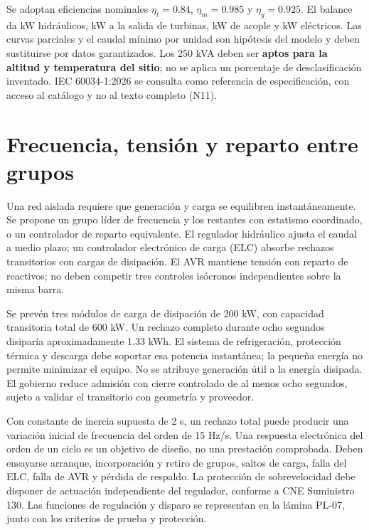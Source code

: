Se adoptan eficiencias nominales \(\eta_t=0.84\), \(\eta_m=0.985\) y \(\eta_g=0.925\). El balance da  kW hidráulicos,  kW a la salida de turbinas,  kW de acople y  kW eléctricos. Las curvas parciales y el caudal mínimo por unidad son hipótesis del modelo y deben sustituirse por datos garantizados. Los 250 kVA deben ser \textbf{aptos para la altitud y temperatura del sitio}; no se aplica un porcentaje de desclasificación inventado. IEC 60034-1:2026 se consulta como referencia de especificación, con acceso al catálogo y no al texto completo (N11).

\section{Frecuencia, tensión y reparto entre grupos}
Una red aislada requiere que generación y carga se equilibren instantáneamente. Se propone un grupo líder de frecuencia y los restantes con estatismo coordinado, o un controlador de reparto equivalente. El regulador hidráulico ajusta el caudal a medio plazo; un controlador electrónico de carga (ELC) absorbe rechazos transitorios con cargas de disipación. El AVR mantiene tensión con reparto de reactivos; no deben competir tres controles isócronos independientes sobre la misma barra.

Se prevén tres módulos de carga de disipación de 200 kW, con capacidad transitoria total de 600 kW. Un rechazo completo durante ocho segundos disiparía aproximadamente 1.33 kWh. El sistema de refrigeración, protección térmica y descarga debe soportar esa potencia instantánea; la pequeña energía no permite minimizar el equipo. No se atribuye generación útil a la energía disipada. El gobierno reduce admisión con cierre controlado de al menos ocho segundos, sujeto a validar el transitorio con geometría y proveedor.

Con constante de inercia supuesta de 2 s, un rechazo total puede producir una variación inicial de frecuencia del orden de 15 Hz/s. Una respuesta electrónica del orden de un ciclo es un objetivo de diseño, no una prestación comprobada. Deben ensayarse arranque, incorporación y retiro de grupos, saltos de carga, falla del ELC, falla de AVR y pérdida de respaldo. La protección de sobrevelocidad debe disponer de actuación independiente del regulador, conforme a CNE Suministro 130.
Las funciones de regulación y disparo se representan en la lámina PL-07, junto con los criterios de prueba y protección.

